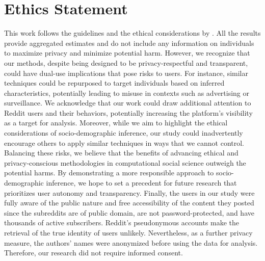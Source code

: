 


\section{Ethics Statement}
This work follows the guidelines and the ethical considerations by \cite{eysenbach2001ethical,moreno2013ethics,ramirez2020detection}.
All the results provide aggregated estimates and do not include any information on individuals to maximize privacy and minimize potential harm. However, we recognize that our methods, despite being designed to be privacy-respectful and transparent, could have dual-use implications that pose risks to users. For instance, similar techniques could be repurposed to target individuals based on inferred characteristics, potentially leading to misuse in contexts such as advertising or surveillance. We acknowledge that our work could draw additional attention to Reddit users and their behaviors, potentially increasing the platform's visibility as a target for analysis. Moreover, while we aim to highlight the ethical considerations of socio-demographic inference, our study could inadvertently encourage others to apply similar techniques in ways that we cannot control. Balancing these risks, we believe that the benefits of advancing ethical and privacy-conscious methodologies in computational social science outweigh the potential harms. By demonstrating a more responsible approach to socio-demographic inference, we hope to set a precedent for future research that prioritizes user autonomy and transparency.
Finally, the users in our study were fully aware of the public nature and free accessibility of the content they posted since the subreddits are of public domain, are not password-protected, and have thousands of active subscribers.
Reddit’s pseudonymous accounts make the retrieval of the true identity of users unlikely.
Nevertheless, as a further privacy measure, the authors’ names were anonymized before using the data for analysis.
Therefore, our research did not require informed consent.
